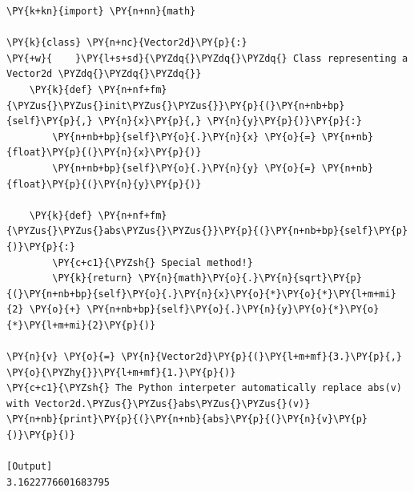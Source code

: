\begin{Verbatim}[label=\makebox{\url{https://github.com/lucabaldini/cmepda/tree/master/slides/latex/snippets/vector2d\_2.py}},commandchars=\\\{\}]
\PY{k+kn}{import} \PY{n+nn}{math}

\PY{k}{class} \PY{n+nc}{Vector2d}\PY{p}{:}
\PY{+w}{    }\PY{l+s+sd}{\PYZdq{}\PYZdq{}\PYZdq{} Class representing a Vector2d \PYZdq{}\PYZdq{}\PYZdq{}}   
    \PY{k}{def} \PY{n+nf+fm}{\PYZus{}\PYZus{}init\PYZus{}\PYZus{}}\PY{p}{(}\PY{n+nb+bp}{self}\PY{p}{,} \PY{n}{x}\PY{p}{,} \PY{n}{y}\PY{p}{)}\PY{p}{:}
        \PY{n+nb+bp}{self}\PY{o}{.}\PY{n}{x} \PY{o}{=} \PY{n+nb}{float}\PY{p}{(}\PY{n}{x}\PY{p}{)}
        \PY{n+nb+bp}{self}\PY{o}{.}\PY{n}{y} \PY{o}{=} \PY{n+nb}{float}\PY{p}{(}\PY{n}{y}\PY{p}{)}
   
    \PY{k}{def} \PY{n+nf+fm}{\PYZus{}\PYZus{}abs\PYZus{}\PYZus{}}\PY{p}{(}\PY{n+nb+bp}{self}\PY{p}{)}\PY{p}{:}
        \PY{c+c1}{\PYZsh{} Special method!}
        \PY{k}{return} \PY{n}{math}\PY{o}{.}\PY{n}{sqrt}\PY{p}{(}\PY{n+nb+bp}{self}\PY{o}{.}\PY{n}{x}\PY{o}{*}\PY{o}{*}\PY{l+m+mi}{2} \PY{o}{+} \PY{n+nb+bp}{self}\PY{o}{.}\PY{n}{y}\PY{o}{*}\PY{o}{*}\PY{l+m+mi}{2}\PY{p}{)}
     
\PY{n}{v} \PY{o}{=} \PY{n}{Vector2d}\PY{p}{(}\PY{l+m+mf}{3.}\PY{p}{,} \PY{o}{\PYZhy{}}\PY{l+m+mf}{1.}\PY{p}{)}
\PY{c+c1}{\PYZsh{} The Python interpeter automatically replace abs(v) with Vector2d.\PYZus{}\PYZus{}abs\PYZus{}\PYZus{}(v)}
\PY{n+nb}{print}\PY{p}{(}\PY{n+nb}{abs}\PY{p}{(}\PY{n}{v}\PY{p}{)}\PY{p}{)}

[Output]
3.1622776601683795
\end{Verbatim}